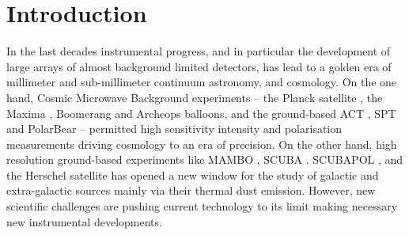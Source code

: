 \documentclass[]{aa} %
\begin{document}
   {}



   \maketitle
%

\section{Introduction}

In the last decades instrumental progress, and in particular the development of
large arrays of almost background limited detectors, has lead to a golden era of
millimeter and sub-millimeter continuum astronomy, and cosmology. On the one
hand, Cosmic Microwave Background experiments -- the Planck satellite \cite{},
the Maxima \cite{}, Boomerang\cite{} and Archeops \cite{} balloons, and the
ground-based ACT \cite{}, SPT \cite{} and PolarBear \cite{} -- permitted high
sensitivity intensity and polarisation measurements driving cosmology to an era
of precision. On the other hand, high resolution ground-based experiments like
MAMBO \cite{}, SCUBA \cite{}. SCUBAPOL \cite{}, and the Herschel satellite
\cite{} has opened a new window for the study of galactic and extra-galactic
sources mainly via their thermal dust emission. However, new scientific
challenges are pushing current technology to its limit making necessary new
instrumental developments. \\

\end{document}
